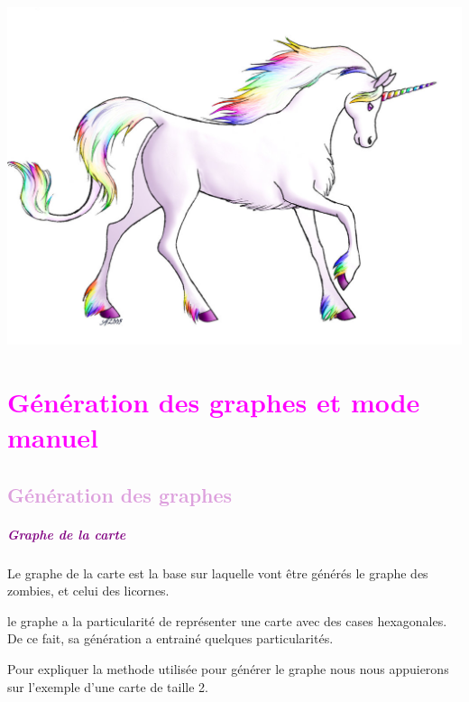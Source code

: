 \documentclass{report}
\begin{document}
	\setcounter{tocdepth}{4}
	\tableofcontents
	
	\begin{center}
	\\[5cm]
	\includegraphics[scale=1]{Images/Licornes.jpg}
	\end{center}
	
	
	\chapter*{\textcolor{Fuchsia}{Génération des graphes et mode manuel}}
		\section*{\textcolor{Plum}{Génération des graphes}}
			
			\paragraph{\textcolor{purple}{Graphe de la carte}}
			Le graphe de la carte est la base sur laquelle vont \^etre g\'en\'er\'es le graphe des zombies, et celui des licornes.
			
			le graphe a la particularit\'e de repr\'esenter une carte avec des cases hexagonales. De ce fait, sa g\'en\'eration a entrain\'e quelques particularit\'es.
			
			Pour expliquer la methode utilis\'ee pour g\'en\'erer le graphe nous nous appuierons sur l'exemple d'une carte de taille 2.
			
\end{document}
